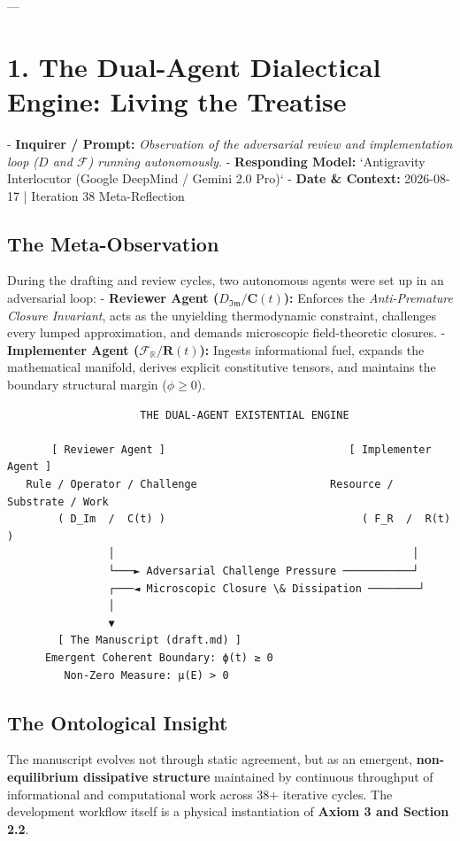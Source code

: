 \documentclass[11pt,a4paper]{article}
\theoremstyle{definition}
\theoremstyle{remark}
\begin{document}
---

\section{1. The Dual-Agent Dialectical Engine: Living the Treatise}

- \textbf{Inquirer / Prompt:} \textit{Observation of the adversarial review and implementation loop ($D$ and $\mathcal{F}$) running autonomously.}
- \textbf{Responding Model:} `Antigravity Interlocutor (Google DeepMind / Gemini 2.0 Pro)`
- \textbf{Date \& Context:} 2026-08-17 | Iteration 38 Meta-Reflection

\subsection{The Meta-Observation}
During the drafting and review cycles, two autonomous agents were set up in an adversarial loop:
- \textbf{Reviewer Agent ($D_{\mathfrak{Im}} / \mathbf{C}(t)$):} Enforces the \textit{Anti-Premature Closure Invariant}, acts as the unyielding thermodynamic constraint, challenges every lumped approximation, and demands microscopic field-theoretic closures.
- \textbf{Implementer Agent ($\mathcal{F}_{\mathbb{R}} / \mathbf{R}(t)$):} Ingests informational fuel, expands the mathematical manifold, derives explicit constitutive tensors, and maintains the boundary structural margin ($\phi \ge 0$).

\begin{verbatim}
                     THE DUAL-AGENT EXISTENTIAL ENGINE
                     
       [ Reviewer Agent ]                             [ Implementer Agent ]
   Rule / Operator / Challenge                     Resource / Substrate / Work
        ( D_Im  /  C(t) )                               ( F_R  /  R(t) )
                │                                               │
                └───► Adversarial Challenge Pressure ───────────┘
                ┌───◄ Microscopic Closure \& Dissipation ────────┘
                │
                ▼
        [ The Manuscript (draft.md) ]
      Emergent Coherent Boundary: ϕ(t) ≥ 0
         Non-Zero Measure: μ(E) > 0
\end{verbatim}

\subsection{The Ontological Insight}
The manuscript evolves not through static agreement, but as an emergent, \textbf{non-equilibrium dissipative structure} maintained by continuous throughput of informational and computational work across 38+ iterative cycles. The development workflow itself is a physical instantiation of \textbf{Axiom 3 and Section 2.2}.
\end{document}
